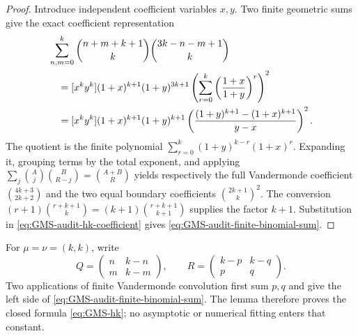 \begin{proof}
Introduce independent coefficient variables $x,y$.  Two finite geometric sums give the exact
coefficient representation
\begin{align}
 &\sum_{n,m=0}^{k}
 \binom{n+m+k+1}{k}\binom{3k-n-m+1}{k}\notag\\
 &\quad=[x^ky^k]
 (1+x)^{k+1}(1+y)^{3k+1}
 \left(\sum_{r=0}^{k}\left(\frac{1+x}{1+y}\right)^r\right)^2\notag\\
 &\quad=[x^ky^k]
 (1+x)^{k+1}(1+y)^{k+1}
 \left(\frac{(1+y)^{k+1}-(1+x)^{k+1}}{y-x}\right)^2.
 \label{eq:GMS-audit-hk-coefficient}
\end{align}
The quotient is the finite polynomial
$\sum_{r=0}^{k}(1+y)^{k-r}(1+x)^r$.  Expanding it, grouping terms by the
total exponent, and applying
$\sum_j\binom Aj\binom B{R-j}=\binom{A+B}{R}$ yields respectively the full
Vandermonde coefficient $\binom{4k+3}{2k+2}$ and the two equal boundary coefficients
$\binom{2k+1}{k}^2$.  The conversion
$(r+1)\binom{r+k+1}{k}=(k+1)\binom{r+k+1}{k+1}$ supplies the factor $k+1$.
Substitution in \eqref{eq:GMS-audit-hk-coefficient} gives
\eqref{eq:GMS-audit-finite-binomial-sum}.
\end{proof}

For $\mu=\nu=(k,k)$, write
\begin{equation}
 Q=\begin{pmatrix}n&k-n\\m&k-m\end{pmatrix},
 \qquad
 R=\begin{pmatrix}k-p&k-q\\p&q\end{pmatrix}.
 \label{eq:GMS-audit-2x2-parameters}
\end{equation}
Two applications of finite Vandermonde convolution first sum $p,q$ and give the left side of
\eqref{eq:GMS-audit-finite-binomial-sum}.  The lemma therefore proves the closed formula
\eqref{eq:GMS-hk}; no asymptotic or numerical fitting enters that constant.

